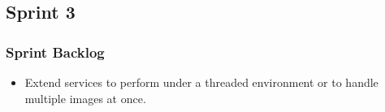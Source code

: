 \documentclass[a4paper,12pt]{report}
\begin{document}
\subsection{Sprint 3}
\subsubsection{Sprint Backlog}
\begin{itemize}
	\item Extend services to perform under a threaded environment or to handle multiple images at once.
\end{itemize}
\end{document}
